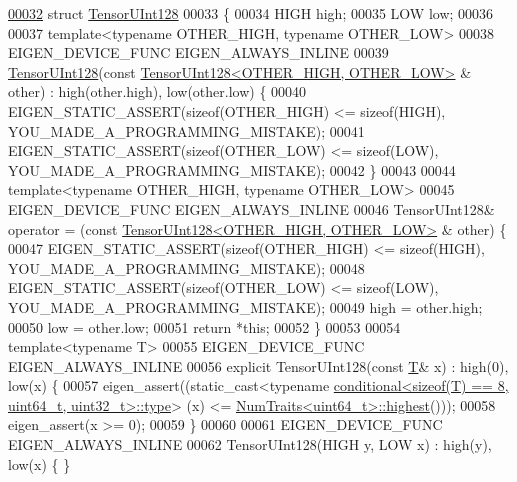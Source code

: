 \begin{DoxyCode}
\hyperlink{struct_eigen_1_1internal_1_1_tensor_u_int128}{00032} \textcolor{keyword}{struct }\hyperlink{struct_eigen_1_1internal_1_1_tensor_u_int128}{TensorUInt128}
00033 \{
00034   HIGH high;
00035   LOW low;
00036 
00037   \textcolor{keyword}{template}<\textcolor{keyword}{typename} OTHER\_HIGH, \textcolor{keyword}{typename} OTHER\_LOW>
00038   EIGEN\_DEVICE\_FUNC EIGEN\_ALWAYS\_INLINE
00039   \hyperlink{struct_eigen_1_1internal_1_1_tensor_u_int128}{TensorUInt128}(\textcolor{keyword}{const} \hyperlink{struct_eigen_1_1internal_1_1_tensor_u_int128}{TensorUInt128<OTHER\_HIGH, OTHER\_LOW>}
      & other) : high(other.high), low(other.low) \{
00040     EIGEN\_STATIC\_ASSERT(\textcolor{keyword}{sizeof}(OTHER\_HIGH) <= \textcolor{keyword}{sizeof}(HIGH), YOU\_MADE\_A\_PROGRAMMING\_MISTAKE);
00041     EIGEN\_STATIC\_ASSERT(\textcolor{keyword}{sizeof}(OTHER\_LOW) <= \textcolor{keyword}{sizeof}(LOW), YOU\_MADE\_A\_PROGRAMMING\_MISTAKE);
00042   \}
00043 
00044   \textcolor{keyword}{template}<\textcolor{keyword}{typename} OTHER\_HIGH, \textcolor{keyword}{typename} OTHER\_LOW>
00045   EIGEN\_DEVICE\_FUNC EIGEN\_ALWAYS\_INLINE
00046   TensorUInt128& operator = (\textcolor{keyword}{const} \hyperlink{struct_eigen_1_1internal_1_1_tensor_u_int128}{TensorUInt128<OTHER\_HIGH, OTHER\_LOW>}
      & other) \{
00047     EIGEN\_STATIC\_ASSERT(\textcolor{keyword}{sizeof}(OTHER\_HIGH) <= \textcolor{keyword}{sizeof}(HIGH), YOU\_MADE\_A\_PROGRAMMING\_MISTAKE);
00048     EIGEN\_STATIC\_ASSERT(\textcolor{keyword}{sizeof}(OTHER\_LOW) <= \textcolor{keyword}{sizeof}(LOW), YOU\_MADE\_A\_PROGRAMMING\_MISTAKE);
00049     high = other.high;
00050     low = other.low;
00051     \textcolor{keywordflow}{return} *\textcolor{keyword}{this};
00052   \}
00053 
00054   \textcolor{keyword}{template}<\textcolor{keyword}{typename} T>
00055   EIGEN\_DEVICE\_FUNC EIGEN\_ALWAYS\_INLINE
00056   \textcolor{keyword}{explicit} TensorUInt128(\textcolor{keyword}{const} \hyperlink{group___sparse_core___module}{T}& x) : high(0), low(x) \{
00057     eigen\_assert((\textcolor{keyword}{static\_cast<}typename 
      \hyperlink{class_eigen_1_1internal_1_1_tensor_lazy_evaluator_writable}{conditional<sizeof(T) == 8, uint64\_t, uint32\_t>::type}\textcolor{keyword}{>}
      (x) <= \hyperlink{group___core___module_struct_eigen_1_1_num_traits}{NumTraits<uint64\_t>::highest}()));
00058     eigen\_assert(x >= 0);
00059   \}
00060 
00061   EIGEN\_DEVICE\_FUNC EIGEN\_ALWAYS\_INLINE
00062   TensorUInt128(HIGH y, LOW x) : high(y), low(x) \{ \}

\end{DoxyCode}
